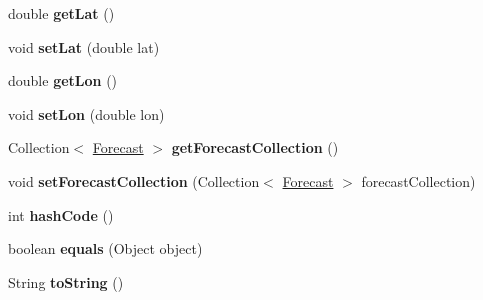 \begin{DoxyCompactItemize}
\item 
\hypertarget{classit_1_1polimi_1_1se_1_1calcare_1_1entities_1_1City_acab3320c22fe931ed7c635b2a91f1343}{}double {\bfseries get\+Lat} ()\label{classit_1_1polimi_1_1se_1_1calcare_1_1entities_1_1City_acab3320c22fe931ed7c635b2a91f1343}

\item 
\hypertarget{classit_1_1polimi_1_1se_1_1calcare_1_1entities_1_1City_abde80d0f3553f3e69296dbc33569d9d9}{}void {\bfseries set\+Lat} (double lat)\label{classit_1_1polimi_1_1se_1_1calcare_1_1entities_1_1City_abde80d0f3553f3e69296dbc33569d9d9}

\item 
\hypertarget{classit_1_1polimi_1_1se_1_1calcare_1_1entities_1_1City_a8cce50294f2989e2be3c9292c560f398}{}double {\bfseries get\+Lon} ()\label{classit_1_1polimi_1_1se_1_1calcare_1_1entities_1_1City_a8cce50294f2989e2be3c9292c560f398}

\item 
\hypertarget{classit_1_1polimi_1_1se_1_1calcare_1_1entities_1_1City_ab726f0f78830d23f7c9478e15733a46e}{}void {\bfseries set\+Lon} (double lon)\label{classit_1_1polimi_1_1se_1_1calcare_1_1entities_1_1City_ab726f0f78830d23f7c9478e15733a46e}

\item 
\hypertarget{classit_1_1polimi_1_1se_1_1calcare_1_1entities_1_1City_a2bf75f13fb13f7ec94516723b387435c}{}Collection$<$ \hyperlink{classit_1_1polimi_1_1se_1_1calcare_1_1entities_1_1Forecast}{Forecast} $>$ {\bfseries get\+Forecast\+Collection} ()\label{classit_1_1polimi_1_1se_1_1calcare_1_1entities_1_1City_a2bf75f13fb13f7ec94516723b387435c}

\item 
\hypertarget{classit_1_1polimi_1_1se_1_1calcare_1_1entities_1_1City_ab93b2bfc72713c390054c835c90c446b}{}void {\bfseries set\+Forecast\+Collection} (Collection$<$ \hyperlink{classit_1_1polimi_1_1se_1_1calcare_1_1entities_1_1Forecast}{Forecast} $>$ forecast\+Collection)\label{classit_1_1polimi_1_1se_1_1calcare_1_1entities_1_1City_ab93b2bfc72713c390054c835c90c446b}

\item 
\hypertarget{classit_1_1polimi_1_1se_1_1calcare_1_1entities_1_1City_a94005ca9288c08969fb5767a404cc416}{}int {\bfseries hash\+Code} ()\label{classit_1_1polimi_1_1se_1_1calcare_1_1entities_1_1City_a94005ca9288c08969fb5767a404cc416}

\item 
\hypertarget{classit_1_1polimi_1_1se_1_1calcare_1_1entities_1_1City_a5c94dd16479f63b97ba866ee25bac358}{}boolean {\bfseries equals} (Object object)\label{classit_1_1polimi_1_1se_1_1calcare_1_1entities_1_1City_a5c94dd16479f63b97ba866ee25bac358}

\item 
\hypertarget{classit_1_1polimi_1_1se_1_1calcare_1_1entities_1_1City_a278e1d7ba177eeca173d739ce6ea6087}{}String {\bfseries to\+String} ()\label{classit_1_1polimi_1_1se_1_1calcare_1_1entities_1_1City_a278e1d7ba177eeca173d739ce6ea6087}

\end{DoxyCompactItemize}


